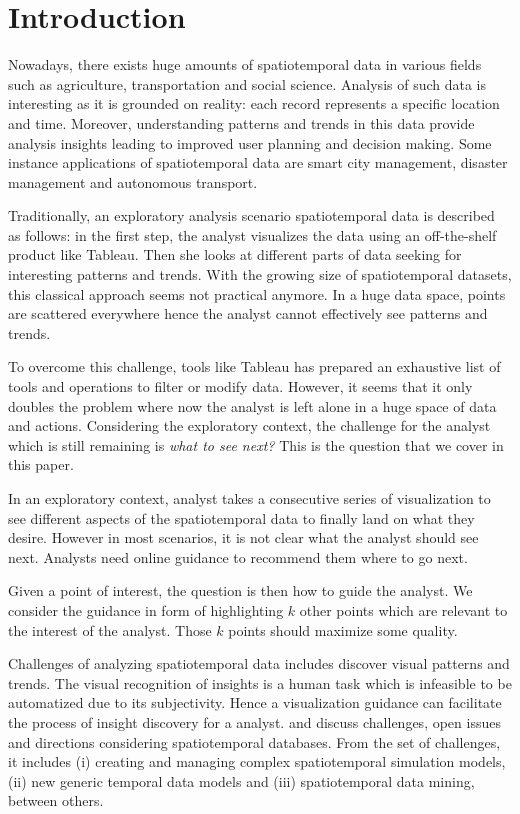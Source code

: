 \section{Introduction} 
Nowadays, there exists huge amounts of spatiotemporal data in various fields such as agriculture, transportation and social science. Analysis of such data is interesting as it is grounded
on reality: each record represents a specific location and time. Moreover, understanding patterns and trends in this data provide analysis insights leading to improved user planning and decision making. Some instance applications of spatiotemporal data are smart city management, disaster management and autonomous transport.

Traditionally, an exploratory analysis scenario spatiotemporal data is described as follows: in the first step, the analyst visualizes the data using an off-the-shelf product like {\sc Tableau}. Then she looks at different parts of data seeking for interesting patterns and trends. With the growing size of spatiotemporal datasets, this classical approach seems not practical anymore. In a huge data space, points are scattered everywhere hence the analyst cannot effectively see patterns and trends.

To overcome this challenge, tools like {\sc Tableau} has prepared an exhaustive list of tools and operations to filter or modify data. However, it seems that it only doubles the problem where now the analyst is left alone in a huge space of data and actions. Considering the exploratory context, the challenge for the analyst which is still remaining is {\em what to see next?} This is the question that we cover in this paper.

In an exploratory context, analyst takes a consecutive series of visualization to see different aspects of the spatiotemporal data to finally land on what they desire. However in most scenarios, it is not clear what the analyst should see next. Analysts need online guidance to recommend them where to go next.

Given a point of interest, the question is then how to guide the analyst. We consider the guidance in form of highlighting $k$ other points which are relevant to the interest of the analyst. Those $k$ points should maximize some quality.

Challenges of analyzing spatiotemporal data includes discover visual patterns
and trends. The visual recognition of insights is a human task which is
infeasible to be automatized due to its subjectivity. Hence a visualization
guidance can facilitate the process of insight discovery for a analyst.
\cite{RoddickEHPS04} and \cite{Telang:2012} discuss challenges, open issues and
directions considering spatiotemporal databases. From the set of challenges, it
includes (i) creating and managing complex spatiotemporal simulation models,
(ii) new generic temporal data models and (iii) spatiotemporal data mining,
between others.         


